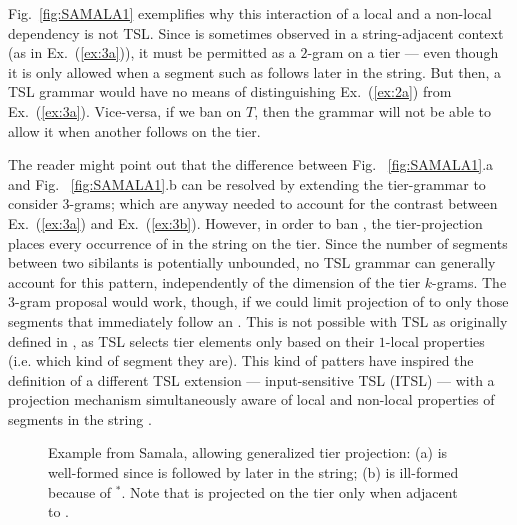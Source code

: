 \documentclass[11pt,a4paper]{article}
\begin{document}
Fig.~\ref{fig:SAMALA1} exemplifies why this interaction of a local and a non-local dependency is not TSL\@. 
Since \textipa{[sn]} is sometimes observed in a string-adjacent context (as in Ex.~(\ref{ex:3a})), it must be permitted as a $2$-gram on a tier --- even though it is only allowed when a segment such as \textipa{[s]} follows later in the string.
But then,  a TSL grammar would have no means of distinguishing Ex.~(\ref{ex:2a}) from Ex.~(\ref{ex:3a}).
Vice-versa, if we ban  \textipa{[sn]} on $T$, then the grammar will not be able to allow it when another \textipa{[s]} follows on the tier.
%

The reader might point out that the difference between Fig.~ \ref{fig:SAMALA1}.a and Fig.~ \ref{fig:SAMALA1}.b can be resolved by extending the tier-grammar to consider $3$-grams; which are anyway needed to account for the contrast between Ex.~(\ref{ex:3a}) and Ex.~(\ref{ex:3b}).
However, in order to ban \textipa{[sn]}, the tier-projection places every occurrence of \textipa{[n]} in the string on the tier.
Since the number of \textipa{[n]} segments between two sibilants is potentially unbounded, no TSL grammar can generally account for this pattern, independently of the dimension of the tier $k$-grams.
The 3-gram proposal would work, though, if we could limit projection of \textipa{[n]} to only those segments that immediately follow an \textipa{[s]}.
This is not possible with TSL as originally defined in \cite{HeinzRawalTanner}, as TSL selects tier elements only based on their $1$-local properties (i.e. which kind of segment they are). %
This kind of patters have inspired the definition of a different TSL extension --- input-sensitive TSL (ITSL) --- with a projection mechanism simultaneously aware of local and non-local properties of segments in the string \citep{desanto2019structure}.

\begin{figure}[]
\begin{center}
    
        \end{center}
        \caption{Example from Samala, allowing generalized tier projection: (a) is well-formed since  \textipa{[sn]} is followed by \textipa{[s]} later in the string; (b) is ill-formed because of $^*$. Note that \textipa{[n]} is projected on the tier only when adjacent to \textipa{[s]}.}
        \label{fig:SAMALA}
        \end{figure}
\end{document}
